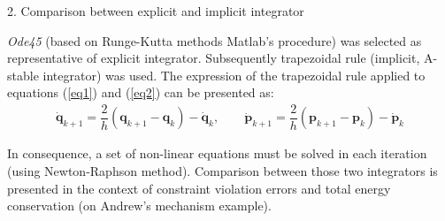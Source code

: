 \documentclass{beamer}
\newcommand{\bb}[1]{\mathbf{#1}}
\begin{document}
\begin{frame}
\begin{columns}
\begin{column}{0.425\paperwidth}
\vskip6pt 
{\Large 2. Comparison between explicit and implicit integrator}
\vskip6pt 

\emph{Ode45} (based on Runge-Kutta methods Matlab's procedure) was selected as representative of explicit integrator. Subsequently trapezoidal rule (implicit, A-stable integrator) was used. The expression of the trapezoidal rule applied to equations (\ref{eq1}) and (\ref{eq2}) can be presented as:
\begin{align}
\bb{\dot{q}}_{k+1}=\dfrac{2}{h}(\bb{q}_{k+1}-\bb{q}_k)-\bb{\dot{q}}_k, \qquad \bb{\dot{p}}_{k+1}=\dfrac{2}{h}(\bb{p}_{k+1}-\bb{p}_k)-\bb{\dot{p}}_k
\end{align}

In consequence, a set of non-linear equations must be solved in each iteration (using Newton-Raphson method). Comparison between those two integrators is presented in the context of constraint violation errors and total energy conservation (on  Andrew's mechanism example). 


\end{column}
\end{columns}
\end{frame}
\end{document}
